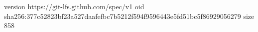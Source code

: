 version https://git-lfs.github.com/spec/v1
oid sha256:377c52823bf23a527daafefbc7b5212f594f9596443e5fd51bc5f86929056279
size 858

